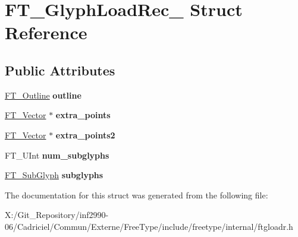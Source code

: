 \hypertarget{struct_f_t___glyph_load_rec__}{\section{F\-T\-\_\-\-Glyph\-Load\-Rec\-\_\- Struct Reference}
\label{struct_f_t___glyph_load_rec__}
}
\subsection*{Public Attributes}
\begin{DoxyCompactItemize}
\item 
\hypertarget{struct_f_t___glyph_load_rec___ae340cdb5263322e86c640b15f82ea72a}{\hyperlink{struct_f_t___outline__}{F\-T\-\_\-\-Outline} {\bfseries outline}}\label{struct_f_t___glyph_load_rec___ae340cdb5263322e86c640b15f82ea72a}

\item 
\hypertarget{struct_f_t___glyph_load_rec___ad2547bd6a7c7473d3a4646dfe908f1c3}{\hyperlink{struct_f_t___vector__}{F\-T\-\_\-\-Vector} $\ast$ {\bfseries extra\-\_\-points}}\label{struct_f_t___glyph_load_rec___ad2547bd6a7c7473d3a4646dfe908f1c3}

\item 
\hypertarget{struct_f_t___glyph_load_rec___a5e8bbe62bd889e806700bc0d583ff79b}{\hyperlink{struct_f_t___vector__}{F\-T\-\_\-\-Vector} $\ast$ {\bfseries extra\-\_\-points2}}\label{struct_f_t___glyph_load_rec___a5e8bbe62bd889e806700bc0d583ff79b}

\item 
\hypertarget{struct_f_t___glyph_load_rec___a71dc4ab52b956b974fe65c95a098e03c}{F\-T\-\_\-\-U\-Int {\bfseries num\-\_\-subglyphs}}\label{struct_f_t___glyph_load_rec___a71dc4ab52b956b974fe65c95a098e03c}

\item 
\hypertarget{struct_f_t___glyph_load_rec___a12ef145fedbeb14cc8b9d320ae3fed96}{\hyperlink{struct_f_t___sub_glyph_rec__}{F\-T\-\_\-\-Sub\-Glyph} {\bfseries subglyphs}}\label{struct_f_t___glyph_load_rec___a12ef145fedbeb14cc8b9d320ae3fed96}

\end{DoxyCompactItemize}


The documentation for this struct was generated from the following file\-:\begin{DoxyCompactItemize}
\item 
X\-:/\-Git\-\_\-\-Repository/inf2990-\/06/\-Cadriciel/\-Commun/\-Externe/\-Free\-Type/include/freetype/internal/ftgloadr.\-h\end{DoxyCompactItemize}
